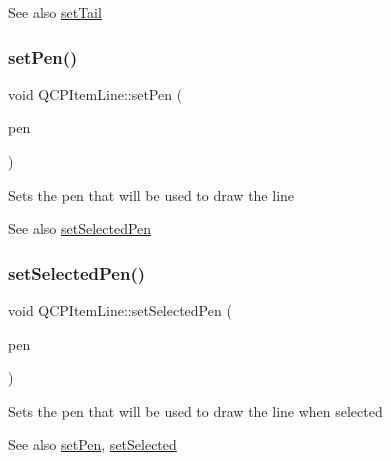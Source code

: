 \begin{DoxySeeAlso}{See also}
\hyperlink{classQCPItemLine_ac264222c3297a7efe33df9345c811a5f}{set\+Tail} 
\end{DoxySeeAlso}
\mbox{\label{classQCPItemLine_a572528dab61c1abe205822fbd5db4b27}} 
\subsubsection{\texorpdfstring{set\+Pen()}{setPen()}}
{\footnotesize\ttfamily void Q\+C\+P\+Item\+Line\+::set\+Pen (\begin{DoxyParamCaption}\item[{const Q\+Pen \&}]{pen }\end{DoxyParamCaption})}

Sets the pen that will be used to draw the line

\begin{DoxySeeAlso}{See also}
\hyperlink{classQCPItemLine_a3e2fec44503277e77717e9c24f87f1ea}{set\+Selected\+Pen} 
\end{DoxySeeAlso}
\mbox{\label{classQCPItemLine_a3e2fec44503277e77717e9c24f87f1ea}} 
\subsubsection{\texorpdfstring{set\+Selected\+Pen()}{setSelectedPen()}}
{\footnotesize\ttfamily void Q\+C\+P\+Item\+Line\+::set\+Selected\+Pen (\begin{DoxyParamCaption}\item[{const Q\+Pen \&}]{pen }\end{DoxyParamCaption})}

Sets the pen that will be used to draw the line when selected

\begin{DoxySeeAlso}{See also}
\hyperlink{classQCPItemLine_a572528dab61c1abe205822fbd5db4b27}{set\+Pen}, \hyperlink{classQCPAbstractItem_a203de94ad586cc44d16c9565f49d3378}{set\+Selected} 
\end{DoxySeeAlso}
\mbox{\label{classQCPItemLine_ac264222c3297a7efe33df9345c811a5f}} 
